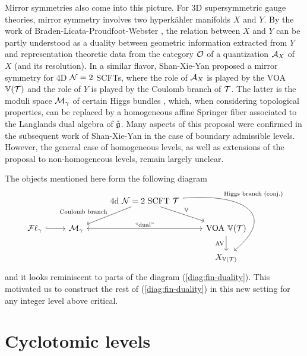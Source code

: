 \documentclass[reqno]{amsart}
\DeclareMathOperator{\cFL}{\mathcal{F}\ell}
\DeclareMathOperator{\AV}{AV}
\begin{document}
Mirror symmetries also come into this picture. For 3D supersymmetric gauge theories, mirror symmetry involves two hyperk\"ahler manifolds $X$ and $Y$. By the work of Braden-Licata-Proudfoot-Webster \cite{BLPW:Gale, BLPW:symp-dual-I, BLPW:symp-dual-II}, the relation between $X$ and $Y$ can be partly understood as a duality between geometric information extracted from $Y$ and representation theoretic data from the category $\mathcal{O}$ of a quantization $\mathcal{A}_X$ of $X$ (and its resolution). In a similar flavor, Shan-Xie-Yan \cite{Shan-Xie-Yan:phys} proposed a mirror symmetry for 4D $\mathcal{N}=2$ SCFTs, where the role of $\mathcal{A}_X$ is played by the VOA $\mathbb{V}(\mathcal{T})$ and the role of $Y$ is played by the Coulomb branch of $\mathcal{T}$. The latter is the moduli space $\mathcal{M}_\gamma$ of certain Higgs bundles \cite{BBAMY:wild-Higgs}, which, when considering topological properties, can be replaced by a homogeneous affine Springer fiber associated to the Langlands dual algebra of $\hat {\mathfrak{g}}$. Many aspects of this proposal were confirmed in the subsequent work \cite{Shan-Xie-Yan} of Shan-Xie-Yan in the case of boundary admissible levels. However, the general case of homogeneous levels, as well as extensions of the proposal to non-homogeneous levels, remain largely unclear.

The objects mentioned here form the following diagram
\begin{equation}\label{diag:4d-mirror}
	\begin{tikzcd}
		&& \text{4d $\cN=2$ SCFT } \cT \ar[dl, "\text{Coulomb branch}"'] \ar[ddr, "\text{Higgs branch (conj.)}", near start, distance=2.5cm, out=5, in=40] \ar[dr, "\BV"]
		\\%
		\cFL_\gamma \ar[r, hook] %
		& \cM_\gamma \ar[rr, leftrightarrow, "\text{``dual''}"]  
		&& \text{VOA } \BV(\cT) \ar[d, "\AV"']
		\\
		&&& X_{\BV(\cT)}
	\end{tikzcd}
\end{equation}
and it looks reminiscent to parts of the diagram (\ref{diag:fin-duality}). This motivated us to construct the rest of (\ref{diag:fin-duality}) in this new setting for any integer level above critical.




\section{Cyclotomic levels}\label{sec:cl}
\end{document}
